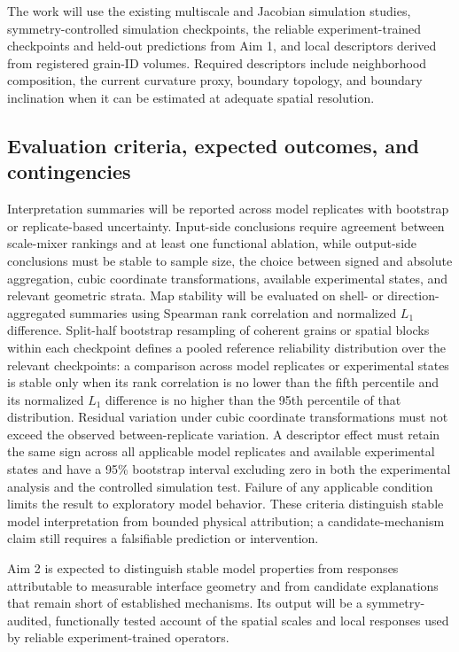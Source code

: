 \documentclass[proposalMode]{ufdissertation}
\begin{document}
The work will use the existing multiscale and Jacobian simulation studies, symmetry-controlled simulation checkpoints, the reliable experiment-trained checkpoints and held-out predictions from Aim 1, and local descriptors derived from registered grain-ID volumes. Required descriptors include neighborhood composition, the current curvature proxy, boundary topology, and boundary inclination when it can be estimated at adequate spatial resolution.

\subsection{Evaluation criteria, expected outcomes, and contingencies}

Interpretation summaries will be reported across model replicates with bootstrap or replicate-based uncertainty. Input-side conclusions require agreement between scale-mixer rankings and at least one functional ablation, while output-side conclusions must be stable to sample size, the choice between signed and absolute aggregation, cubic coordinate transformations, available experimental states, and relevant geometric strata. Map stability will be evaluated on shell- or direction-aggregated summaries using Spearman rank correlation and normalized \(L_1\) difference. Split-half bootstrap resampling of coherent grains or spatial blocks within each checkpoint defines a pooled reference reliability distribution over the relevant checkpoints: a comparison across model replicates or experimental states is stable only when its rank correlation is no lower than the fifth percentile and its normalized \(L_1\) difference is no higher than the 95th percentile of that distribution. Residual variation under cubic coordinate transformations must not exceed the observed between-replicate variation. A descriptor effect must retain the same sign across all applicable model replicates and available experimental states and have a 95\% bootstrap interval excluding zero in both the experimental analysis and the controlled simulation test. Failure of any applicable condition limits the result to exploratory model behavior. These criteria distinguish stable model interpretation from bounded physical attribution; a candidate-mechanism claim still requires a falsifiable prediction or intervention.

Aim 2 is expected to distinguish stable model properties from responses attributable to measurable interface geometry and from candidate explanations that remain short of established mechanisms. Its output will be a symmetry-audited, functionally tested account of the spatial scales and local responses used by reliable experiment-trained operators.
\end{document}

